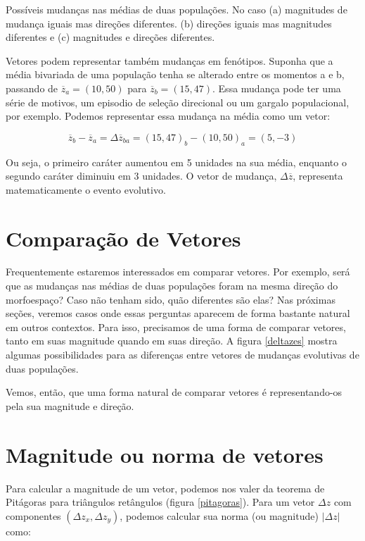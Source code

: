 \documentclass[portuges,]{tufte-handout}
\begin{document}
\begin{marginfigure}
\caption{Possíveis mudanças nas médias de duas populações. No
caso (a) magnitudes de mudança iguais mas direções diferentes. (b)
direções iguais mas magnitudes diferentes e (c) magnitudes e direções
diferentes.}
\label{deltazes}
\end{marginfigure}

Vetores podem representar também mudanças em fenótipos. Suponha que a
média bivariada de uma população tenha se alterado entre os momentos a e
b, passando de $\overline z_a=(10, 50)$ para $\overline z_b=(15, 47)$.
Essa mudança pode ter uma série de motivos, um episodio de seleção
direcional ou um gargalo populacional, por exemplo. Podemos representar
essa mudança na média como um vetor:

\[
\overline z_b - \overline z_a = \Delta \overline z_{ba} = (15, 47)_b - (10, 50)_a = (5, -3)
\]

Ou seja, o primeiro caráter aumentou em 5 unidades na sua média,
enquanto o segundo caráter diminuiu em 3 unidades. O vetor de mudança,
$\Delta \overline z$, representa matematicamente o evento evolutivo.

\section{Comparação de Vetores}\label{comparauxe7uxe3o-de-vetores}

Frequentemente estaremos interessados em comparar vetores. Por exemplo,
será que as mudanças nas médias de duas populações foram na mesma
direção do morfoespaço? Caso não tenham sido, quão diferentes são elas?
Nas próximas seções, veremos casos onde essas perguntas aparecem de
forma bastante natural em outros contextos. Para isso, precisamos de uma
forma de comparar vetores, tanto em suas magnitude quando em suas
direção. A figura \ref{deltazes} mostra algumas possibilidades para as
diferenças entre vetores de mudanças evolutivas de duas populações.

Vemos, então, que uma forma natural de comparar vetores é
representando-os pela sua magnitude e direção.

\section{Magnitude ou norma de
vetores}\label{magnitude-ou-norma-de-vetores}

Para calcular a magnitude de um vetor, podemos nos valer da teorema de
Pitágoras para triângulos retângulos (figura \ref{pitagoras}). Para um
vetor $\Delta z$ com componentes $(\Delta z_x, \Delta z_y)$, podemos
calcular sua norma (ou magnitude) $|\Delta z|$ como:
\end{document}
